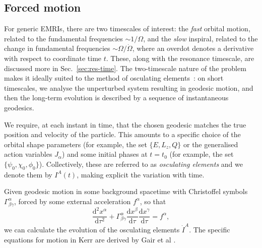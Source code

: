 \documentclass[aps,prd,amsfonts,amssymb,amsmath,nofootinbib,reprint,showpacs,superscriptaddress,twocolumn]{revtex4}
\newcommand{\secref}[1]{Sec.\ \ref{sec:#1}}
\newcommand{\dd}{\ensuremath{\mathrm{d}}}
\newcommand{\diff}[2]{\ensuremath{\dfrac{\dd {#1}}{\dd {#2}}}}
\newcommand{\difftwo}[2]{\ensuremath{\dfrac{\dd^2 {#1}}{\dd {#2}^2}}}
\begin{document}


\subsection{Forced motion}
\label{sec:forced-motion}

For generic EMRIs, there are two timescales of interest: the \emph{fast} orbital motion, related to the fundamental frequencies $\sim1/\Omega$, and the \emph{slow} inspiral, related to the change in fundamental frequencies $\sim\Omega/\dot{\Omega}$, where an overdot denotes a derivative with respect to coordinate time $t$. These, along with the resonance timescale, are discussed more in \secref{res-time}. The two-timescale nature of the problem makes it ideally suited to the method of osculating elements~\cite{Gair2011a}: on short timescales, we analyse the unperturbed system resulting in geodesic motion, and then the long-term evolution is described by a sequence of instantaneous geodesics.

We require, at each instant in time, that the chosen geodesic matches the true position and velocity of the particle. This amounts to a specific choice of the orbital shape parameters (for example, the set $\{E,L_z,Q\}$ or the generalised action variables $J_\alpha$) and some initial phases at $t=t_0$ (for example, the set $\{\psi_0,\chi_0,\phi_0\}$). Collectively, these are referred to as \emph{osculating elements} and we denote them by $I^A(t)$, making explicit the variation with time.

Given geodesic motion in some background spacetime with Christoffel symbols $\Gamma^\alpha_{\beta\gamma}$, forced by some external acceleration $f^\alpha$, so that
\begin{equation}
\difftwo{x^\alpha}{\tau} + \Gamma^\alpha_{\beta\gamma}\diff{x^\beta}{\tau}\diff{x^\gamma}{\tau} = f^\alpha,
\end{equation}
we can calculate the evolution of the osculating elements $\dot{I}^A$. The specific equations for motion in Kerr are derived by Gair et al \cite{Gair2011a}.
\end{document}
